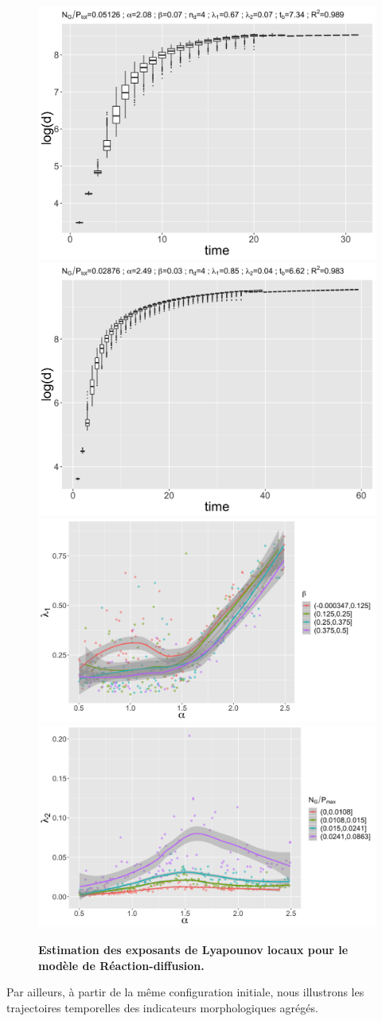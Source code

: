 \documentclass[11pt]{article}
\begin{document}
\begin{figure}
	\includegraphics[width=0.49\linewidth]{figures/configdist_boxplot_id3642.png}
	\includegraphics[width=0.49\linewidth]{figures/configdist_boxplot_id3784.png}
	\includegraphics[width=0.49\linewidth]{figures/lambda1_alpha_colbeta.png}
	\includegraphics[width=0.49\linewidth]{figures/lambda2_alpha_colrelgrowthrate.png}
	\caption{\textbf{Estimation des exposants de Lyapounov locaux pour le modèle de Réaction-diffusion.}}
	\label{fig:lyapounov}
\end{figure}

Par ailleurs, à partir de la même configuration initiale, nous illustrons les trajectoires temporelles des indicateurs morphologiques agrégés.
\end{document}
